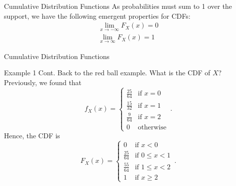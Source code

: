 \documentclass[10pt]{beamer}
\begin{document}
\begin{frame}[fragile]{Cumulative Distribution Functions}
As probabilities must sum to 1 over the support, we have the following emergent properties for CDFs:
\begin{align*}
    \lim_{x\rightarrow-\infty}F_X\left(x\right) = 0\\
    \lim_{x\rightarrow\infty}F_X\left(x\right) = 1
\end{align*}
\end{frame}

\begin{frame}[fragile]{Cumulative Distribution Functions}
\begin{exampleblock}{Example 1 Cont.}
Back to the red ball example. What is the CDF of \(X\)? Previously, we found that
\begin{equation*}
    f_X\left(x\right) =
    \begin{cases}
        \frac{25}{64} & \text{if } x = 0\\
        \frac{15}{32} & \text{if } x = 1\\
        \frac{9}{64} & \text{if } x = 2\\
        0 & \text{otherwise}
    \end{cases}\,.
\end{equation*}
Hence, the CDF is
\begin{equation*}
    F_X\left(x\right) =
    \begin{cases}
        0 & \text{if } x < 0\\
        \frac{25}{64} & \text{if } 0 \leq x < 1\\
        \frac{55}{64} & \text{if } 1 \leq x < 2\\
        1 & \text{if } x \geq 2
    \end{cases}\,.
\end{equation*}
\end{exampleblock}
\end{frame}
\end{document}
